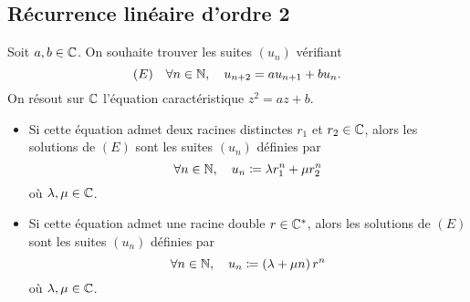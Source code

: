 \documentclass{magnoliaold}
\begin{document}



\subsection{Récurrence linéaire d'ordre 2}
\begin{proposition}[utile=-3]
Soit $a,b\in\mathbb{C}$. On souhaite trouver les suites $(u_n)$ vérifiant
\[(E)\quad\forall n\in\mathbb{N} ,\quad u_{n+2}=au_{n+1}+b u_n.\]
On résout sur $\mathbb{C}$ l'équation caractéristique $z^2=az+b$.
\begin{itemize}
\item Si cette équation admet deux racines distinctes $r_1$ et $r_2\in\mathbb{C}$, alors
  les solutions de $(E)$ sont les suites $(u_n)$ définies par
  \[\forall n\in\mathbb{N} ,\quad u_n\coloneqq\lambda r_1^n +\mu r_2^n\]
  où $\lambda,\mu\in\mathbb{C}$.
\item Si cette équation admet une racine double $r\in\mathbb{C}^*$, alors 
  les solutions de $(E)$ sont les suites $(u_n)$ définies par
  \[\forall n\in\mathbb{N} ,\quad u_n\coloneqq\left(\lambda +\mu n\right)r^n\]
  où $\lambda,\mu\in\mathbb{C}$.
\end{itemize}
\end{proposition}
\end{document}
